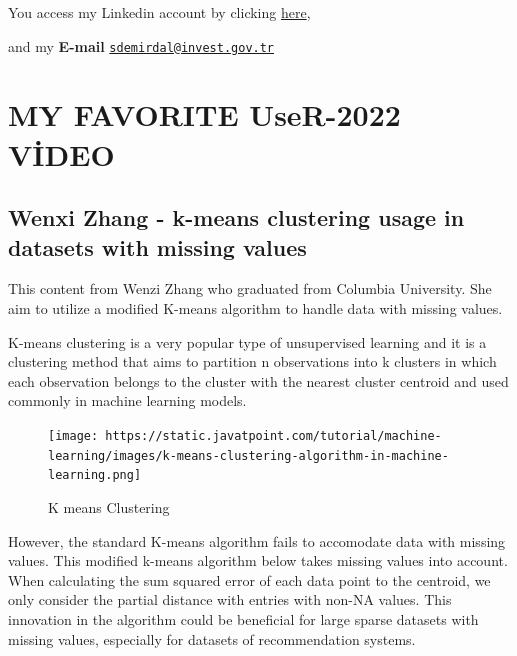 \documentclass[
  letterpaper,
  DIV=11,
  numbers=noendperiod]{scrreprt}
\begin{document}
You access my Linkedin account by clicking
\href{https://www.linkedin.com/in/sabri-demirdal-0508a1169/}{here},

and my \textbf{E-mail}
\href{mailto:sdemirdal@invest.gov.tr}{\nolinkurl{sdemirdal@invest.gov.tr}}


\hypertarget{my-favorite-user-2022-video}{%
\chapter{MY FAVORITE UseR-2022
VİDEO}\label{my-favorite-user-2022-video}}

\hypertarget{wenxi-zhang---k-means-clustering-usage-in-datasets-with-missing-values}{%
\section{Wenxi Zhang - k-means clustering usage in datasets with missing
values}\label{wenxi-zhang---k-means-clustering-usage-in-datasets-with-missing-values}}

This content from Wenzi Zhang who graduated from Columbia University.
She aim to utilize a modified K-means algorithm to handle data with
missing values.

K-means clustering is a very popular type of unsupervised learning and
it is a clustering method that aims to partition n observations into k
clusters in which each observation belongs to the cluster with the
nearest cluster centroid and used commonly in machine learning models.

\begin{figure}

{\centering \texttt{[image: https://static.javatpoint.com/tutorial/machine-learning/images/k-means-clustering-algorithm-in-machine-learning.png]}

}

\caption{K means Clustering}

\end{figure}

However, the standard K-means algorithm fails to accomodate data with
missing values. This modified k-means algorithm below takes missing
values into account. When calculating the sum squared error of each data
point to the centroid, we only consider the partial distance with
entries with non-NA values. This innovation in the algorithm could be
beneficial for large sparse datasets with missing values, especially for
datasets of recommendation systems.
\end{document}
